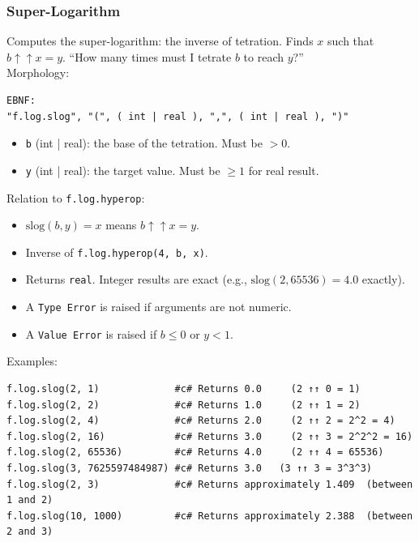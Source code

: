 \subsubsection{Super-Logarithm}
Computes the super-logarithm: the inverse of tetration. Finds $x$ such that $b \uparrow\uparrow x = y$. ``How many times must I tetrate $b$ to reach $y$?''\\
Morphology:
\begin{verbatim}
EBNF:
"f.log.slog", "(", ( int | real ), ",", ( int | real ), ")"
\end{verbatim}
\begin{itemize}
\item \texttt{b} (int | real): the base of the tetration. Must be $> 0$.
\item \texttt{y} (int | real): the target value. Must be $\geq 1$ for real result.
\end{itemize}

\noindent Relation to \texttt{f.log.hyperop}:
\begin{itemize}
\item $\text{slog}(b, y) = x$ means $b \uparrow\uparrow x = y$.
\item Inverse of \texttt{f.log.hyperop(4, b, x)}.
\end{itemize}

\begin{itemize}
\item Returns \texttt{real}. Integer results are exact (e.g., $\text{slog}(2, 65536) = 4.0$ exactly).
\item A \texttt{Type Error} is raised if arguments are not numeric.
\item A \texttt{Value Error} is raised if $b \leq 0$ or $y < 1$.
\end{itemize}

Examples:
\begin{verbatim}
f.log.slog(2, 1)             #c# Returns 0.0     (2 ↑↑ 0 = 1)
f.log.slog(2, 2)             #c# Returns 1.0     (2 ↑↑ 1 = 2)
f.log.slog(2, 4)             #c# Returns 2.0     (2 ↑↑ 2 = 2^2 = 4)
f.log.slog(2, 16)            #c# Returns 3.0     (2 ↑↑ 3 = 2^2^2 = 16)
f.log.slog(2, 65536)         #c# Returns 4.0     (2 ↑↑ 4 = 65536)
f.log.slog(3, 7625597484987) #c# Returns 3.0   (3 ↑↑ 3 = 3^3^3)
f.log.slog(2, 3)             #c# Returns approximately 1.409  (between 1 and 2)
f.log.slog(10, 1000)         #c# Returns approximately 2.388  (between 2 and 3)
\end{verbatim}

